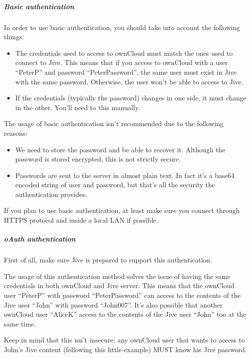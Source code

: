 \documentclass[letterpaper,10pt,english]{sphinxmanual}
\begin{document}
\subparagraph{Basic authentication}
\label{enterprise_external_storage/jive_configuration:basic-authentication}
In order to use basic authentication, you should take into account the following things:
\begin{itemize}
\item {} 
The credentials used to access to ownCloud must match the ones used to connect to Jive. This means that if you
access to ownCloud with a user “PeterP” and password “PeterPassword”, the same user must exist in Jive with the same
password. Otherwise, the user won't be able to access to Jive.

\item {} 
If the credentials (typically the password) changes in one side, it must change in the other. You'll need to this manually.

\end{itemize}

The usage of basic authentication isn't recommended due to the following reasons:
\begin{itemize}
\item {} 
We need to store the password and be able to recover it. Although the password is stored encrypted, this is
not strictly secure.

\item {} 
Passwords are sent to the server in almost plain text. In fact it's a base64 encoded string of user and password,
but that's all the security the authentication provides.

\end{itemize}

If you plan to use basic authentication, at least make sure you connect through HTTPS protocol and inside a local LAN if possible.


\subparagraph{oAuth authentication}
\label{enterprise_external_storage/jive_configuration:oauth-authentication}
First of all, make sure Jive is prepared to support this authentication.

The usage of this authentication method solves the issue of having the same credentials in both ownCloud and Jive
server. This means that the ownCloud user “PeterP” with password “PeterPassword” can access to the contents of the Jive
user “John” with password “John007”. It's also possible that another ownCloud user “AliceK” access to the contents of
the Jive user “John” too at the same time.

Keep in mind that this isn't insecure: any ownCloud user that wants to access to John's Jive content (following
this little example) MUST know his Jive password.
\end{document}
